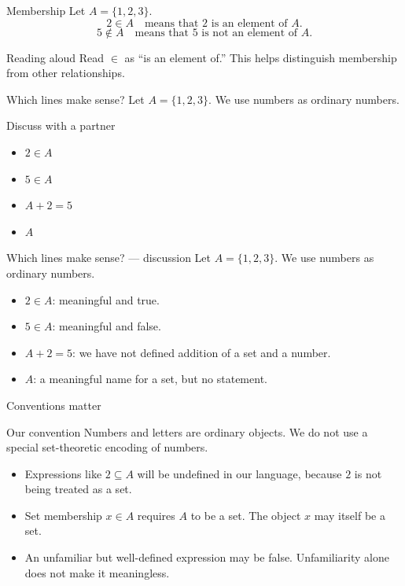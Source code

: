 \documentclass{beamer}
\begin{document}
\begin{frame}{Membership}
Let $A=\{1,2,3\}$.
\[2\in A\quad\text{means that 2 is an element of }A.\]
\[5\notin A\quad\text{means that 5 is not an element of }A.\]
\begin{block}{Reading aloud}
Read $\in$ as ``is an element of.'' This helps distinguish membership from other relationships.
\end{block}
\end{frame}
\begin{frame}{Which lines make sense?}
Let $A=\{1,2,3\}$. We use numbers as ordinary numbers.
\begin{block}{Discuss with a partner}
\begin{itemize}
\item $2\in A$
\item $5\in A$
\item $A+2=5$
\item $A$
\end{itemize}
\end{block}
\end{frame}
\begin{frame}{Which lines make sense? --- discussion}
Let $A=\{1,2,3\}$. We use numbers as ordinary numbers.
\begin{itemize}
\item $2\in A$: meaningful and true.
\item $5\in A$: meaningful and false.
\item $A+2=5$: we have not defined addition of a set and a number.
\item $A$: a meaningful name for a set, but no statement.
\end{itemize}
\end{frame}
\begin{frame}{Conventions matter}
\begin{block}{Our convention}
Numbers and letters are ordinary objects. We do not use a special set-theoretic encoding of numbers.
\end{block}\begin{itemize}
\item Expressions like $2\subseteq A$ will be undefined in our language, because $2$ is not being treated as a set.
\item Set membership $x\in A$ requires $A$ to be a set. The object $x$ may itself be a set.
\item An unfamiliar but well-defined expression may be false. Unfamiliarity alone does not make it meaningless.
\end{itemize}
\end{frame}
\end{document}
